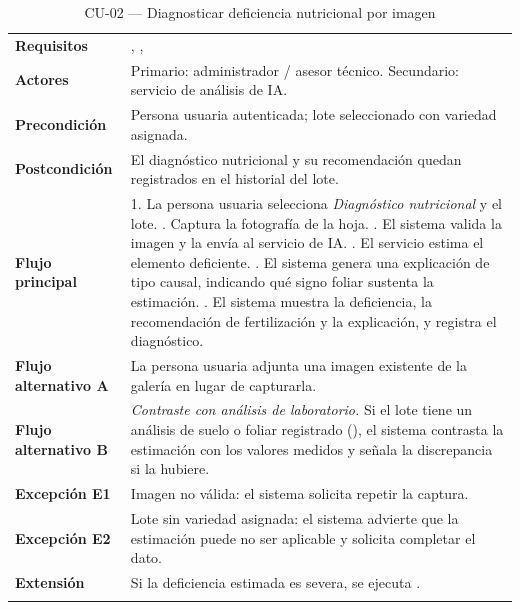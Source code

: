 \begin{longtable}{|L{3.4cm}|L{12.0cm}|}
\hline
{}\\
\hline
\textbf{Requisitos} & , ,  \\ \hline
\textbf{Actores} & Primario: administrador / asesor técnico. Secundario: servicio de análisis de IA. \\ \hline
\textbf{Precondición} & Persona usuaria autenticada; lote seleccionado con variedad asignada. \\ \hline
\textbf{Postcondición} & El diagnóstico nutricional y su recomendación quedan registrados en el historial del lote. \\ \hline
\textbf{Flujo principal} & 1. La persona usuaria selecciona \emph{Diagnóstico nutricional} y el lote. . Captura la fotografía de la hoja. . El sistema valida la imagen y la envía al servicio de IA. . El servicio estima el elemento deficiente. . El sistema genera una explicación de tipo causal, indicando qué signo foliar sustenta la estimación. . El sistema muestra la deficiencia, la recomendación de fertilización y la explicación, y registra el diagnóstico. \\ \hline
\textbf{Flujo alternativo A} & La persona usuaria adjunta una imagen existente de la galería en lugar de capturarla. \\ \hline
\textbf{Flujo alternativo B} & \emph{Contraste con análisis de laboratorio.} Si el lote tiene un análisis de suelo o foliar registrado (), el sistema contrasta la estimación con los valores medidos y señala la discrepancia si la hubiere. \\ \hline
\textbf{Excepción E1} & Imagen no válida: el sistema solicita repetir la captura. \\ \hline
\textbf{Excepción E2} & Lote sin variedad asignada: el sistema advierte que la estimación puede no ser aplicable y solicita completar el dato. \\ \hline
\textbf{Extensión} & Si la deficiencia estimada es severa, se ejecuta . \\ \hline
\caption{CU-02 --- Diagnosticar deficiencia nutricional por imagen}
\end{longtable}

